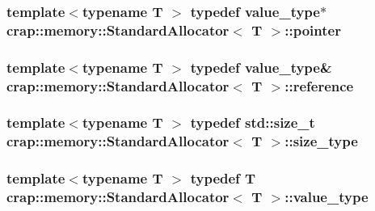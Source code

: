 \hypertarget{classcrap_1_1memory_1_1_standard_allocator_a92221f3975cb89b59eaa308e8a470c6d}{
\subsubsection[{pointer}]{\setlength{\rightskip}{0pt plus 5cm}template$<$typename T $>$ typedef {\bf value\-\_\-type}$\ast$ {\bf crap\-::memory\-::\-Standard\-Allocator}$<$ T $>$\-::{\bf pointer}}}\label{classcrap_1_1memory_1_1_standard_allocator_a92221f3975cb89b59eaa308e8a470c6d}
\hypertarget{classcrap_1_1memory_1_1_standard_allocator_ad4f01aad766fa81a29635512e8096f47}{
\subsubsection[{reference}]{\setlength{\rightskip}{0pt plus 5cm}template$<$typename T $>$ typedef {\bf value\-\_\-type}\& {\bf crap\-::memory\-::\-Standard\-Allocator}$<$ T $>$\-::{\bf reference}}}\label{classcrap_1_1memory_1_1_standard_allocator_ad4f01aad766fa81a29635512e8096f47}
\hypertarget{classcrap_1_1memory_1_1_standard_allocator_a647535d0ddf782ac9cf2d77c6a63aa59}{
\subsubsection[{size\-\_\-type}]{\setlength{\rightskip}{0pt plus 5cm}template$<$typename T $>$ typedef std\-::size\-\_\-t {\bf crap\-::memory\-::\-Standard\-Allocator}$<$ T $>$\-::{\bf size\-\_\-type}}}\label{classcrap_1_1memory_1_1_standard_allocator_a647535d0ddf782ac9cf2d77c6a63aa59}
\hypertarget{classcrap_1_1memory_1_1_standard_allocator_a2b377d4555fd42cd31d050856a8d389c}{
\subsubsection[{value\-\_\-type}]{\setlength{\rightskip}{0pt plus 5cm}template$<$typename T $>$ typedef T {\bf crap\-::memory\-::\-Standard\-Allocator}$<$ T $>$\-::{\bf value\-\_\-type}}}\label{classcrap_1_1memory_1_1_standard_allocator_a2b377d4555fd42cd31d050856a8d389c}



